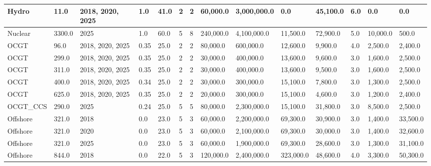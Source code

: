 \documentclass[sigconf]{acmart}
\begin{document}
\begin{table*}[]
\begin{tabularx}{\linewidth}{|p{}|l|x|l|l|l|l|l|l|l|l|l|l|l|}
Hydro                         & 11.0        & 2018, 2020, 2025 & 1.0    & 41.0 & 2     & 2     & 60,000.0  & 3,000,000.0 & 0.0       & 45,100.0 & 6.0   & 0.0      & 0.0       \\ \hline
Nuclear                       & 3300.0      & 2025             & 1.0    & 60.0 & 5     & 8     & 240,000.0 & 4,100,000.0 & 11,500.0  & 72,900.0 & 5.0   & 10,000.0 & 500.0     \\ \hline
OCGT                          & 96.0        & 2018, 2020, 2025 & 0.35   & 25.0 & 2     & 2     & 80,000.0  & 600,000.0   & 12,600.0  & 9,900.0  & 4.0   & 2,500.0  & 2,400.0   \\ \hline
OCGT                          & 299.0       & 2018, 2020, 2025 & 0.35   & 25.0 & 2     & 2     & 30,000.0  & 400,000.0   & 13,600.0  & 9,600.0  & 3.0   & 1,600.0  & 2,500.0   \\ \hline
OCGT                          & 311.0       & 2018, 2020, 2025 & 0.35   & 25.0 & 2     & 2     & 30,000.0  & 400,000.0   & 13,600.0  & 9,500.0  & 3.0   & 1,600.0  & 2,500.0   \\ \hline
OCGT                          & 400.0       & 2018, 2020, 2025 & 0.34   & 25.0 & 2     & 2     & 30,000.0  & 300,000.0   & 15,100.0  & 7,800.0  & 3.0   & 1,300.0  & 2,500.0   \\ \hline
OCGT                          & 625.0       & 2018, 2020, 2025 & 0.35   & 25.0 & 2     & 2     & 20,000.0  & 300,000.0   & 15,100.0  & 4,600.0  & 3.0   & 1,200.0  & 2,400.0   \\ \hline
OCGT\_CCS                     & 290.0       & 2025             & 0.24   & 25.0 & 5     & 5     & 80,000.0  & 2,300,000.0 & 15,100.0  & 31,800.0 & 3.0   & 8,500.0  & 2,500.0   \\ \hline
Offshore                      & 321.0       & 2018             & 0.0    & 23.0 & 5     & 3     & 60,000.0  & 2,200,000.0 & 69,300.0  & 30,900.0 & 3.0   & 1,400.0  & 33,500.0  \\ \hline
Offshore                      & 321.0       & 2020             & 0.0    & 23.0 & 5     & 3     & 60,000.0  & 2,100,000.0 & 69,300.0  & 30,000.0 & 3.0   & 1,400.0  & 32,600.0  \\ \hline
Offshore                      & 321.0       & 2025             & 0.0    & 23.0 & 5     & 3     & 60,000.0  & 1,900,000.0 & 69,300.0  & 28,600.0 & 3.0   & 1,300.0  & 31,100.0  \\ \hline
Offshore                      & 844.0       & 2018             & 0.0    & 22.0 & 5     & 3     & 120,000.0 & 2,400,000.0 & 323,000.0 & 48,600.0 & 4.0   & 3,300.0  & 50,300.0  \\ \hline

\end{tabularx}
\end{table*}
\end{document}
